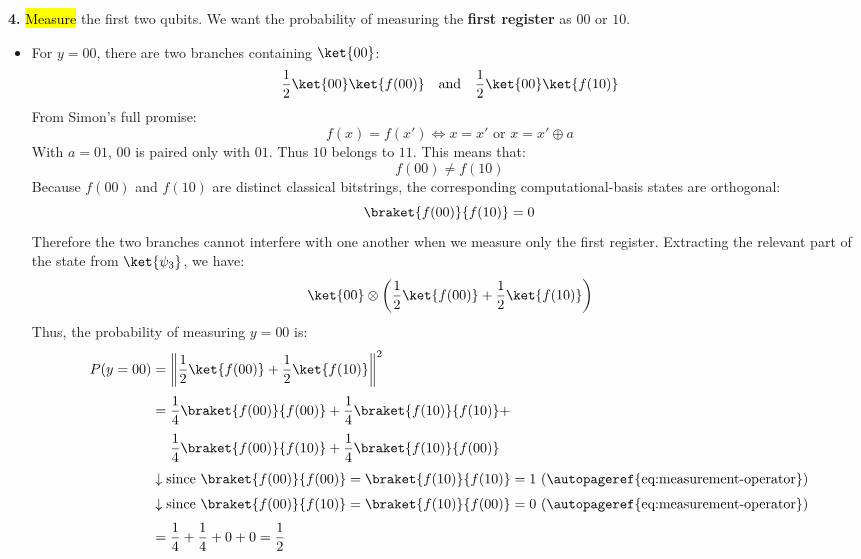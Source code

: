 \highspace
\textbf{4.} \hl{Measure} the first two qubits. We want the probability of measuring the \textbf{first register} as $00$ or $10$.
\begin{itemize}
    \item For $y=00$, there are two branches containing $\ket{00}$:
        \begin{equation*}
            \frac{1}{2}\ket{00}\ket{f(00)} \quad \text{and} \quad \frac{1}{2}\ket{00}\ket{f(10)}
        \end{equation*}
        From Simon's full promise:
        \begin{equation*}
            f(x) = f(x') \iff x = x' \text{ or } x = x' \oplus a
        \end{equation*}
        With $a=01$, $00$ is paired only with $01$. Thus $10$ belongs to $11$. This means that:
        \begin{equation*}
            f(00) \neq f(10)
        \end{equation*}
        Because $f(00)$ and $f(10)$ are distinct classical bitstrings, the corresponding computational-basis states are orthogonal:
        \begin{equation*}
            \braket{f(00)}{f(10)} = 0
        \end{equation*}
        Therefore the two branches cannot interfere with one another when we measure only the first register. Extracting the relevant part of the state from $\ket{\psi_3}$, we have:
        \begin{equation*}
            \ket{00} \otimes \left(
                \frac{1}{2}\ket{f(00)} + \frac{1}{2}\ket{f(10)}
            \right)
        \end{equation*}
        Thus, the probability of measuring $y=00$ is:
        \begin{align*}
            P(y=00) &= \left\|
            \frac{1}{2}\ket{f(00)} + \frac{1}{2}\ket{f(10)}
            \right\|^{2} \\[.3em]
            &=
            \frac{1}{4}\braket{f(00)}{f(00)} +
            \frac{1}{4}\braket{f(10)}{f(10)} + \\[.3em]
            &\phantom{=} \;\;
            \frac{1}{4}\braket{f(00)}{f(10)} +
            \frac{1}{4}\braket{f(10)}{f(00)} \\[.3em]
            &\downarrow \text{since }\braket{f(00)}{f(00)} = \braket{f(10)}{f(10)} = 1 \text{ (\autopageref{eq:measurement-operator})} \\[.3em]
            &\downarrow \text{since }\braket{f(00)}{f(10)} = \braket{f(10)}{f(00)} = 0 \text{ (\autopageref{eq:measurement-operator})} \\[.3em]
            &= \frac{1}{4} + \frac{1}{4} + 0 + 0 = \frac{1}{2}
        \end{align*}


\end{itemize}
